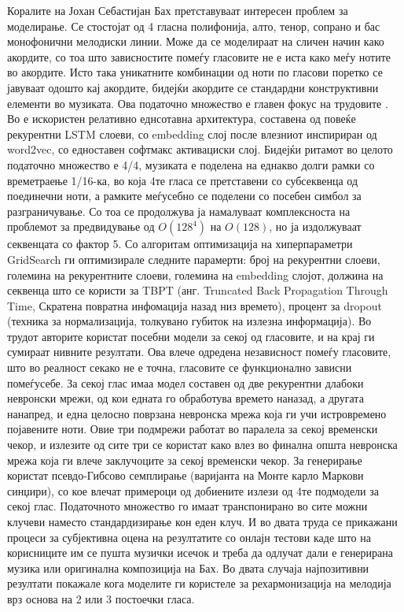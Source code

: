 Коралите на Јохан Себастијан Бах претставуваат интересен проблем за моделирање. Се стостојат од 4 гласна полифонија, алто, тенор, сопрано и бас монофонични мелодиски линии. Може да се моделираат на сличен начин како акордите, со тоа што зависностите помеѓу гласовите не е иста како меѓу нотите во акордите. Исто така уникатните комбинации од ноти по гласови поретко се јавуваат одошто кај акордите, бидејќи акордите се стандардни конструктивни елементи во музиката. Ова податочно множество е главен фокус на трудовите \cite{Liang2017, Hadjeres2016}. Во \cite{Liang2017} е искористен релативно еднсотавна архитектура, составена од повеќе рекурентни LSTM слоеви, со embedding слој после влезниот инспириран од word2vec\cite{Herremans2017}, со едноставен софтмакс активациски слој. Бидејќи ритамот во целото податочно множество е 4/4, музиката е поделена на еднакво долги рамки со времетраење 1/16-ка, во која 4те гласа се претставени со субсеквенца од поединечни ноти, а рамките меѓусебно се поделени со посебен симбол за разграничување. Со тоа се продолжува ја намалуваат комплексноста на проблемот за предвидување од $O(128^4)$ на $O(128)$, но ја издолжуваат секвенцата со фактор 5. Со алгоритам оптимизација на хиперпараметри GridSearch ги оптимизирале следните парамерти: број на рекурентни слоеви, големина на рекурентните слоеви, големина на embedding слојот, должина на секвенца што се користи за TBPT (анг. Truncated Back Propagation Through Time, Скратена повратна инфомација назад низ времето), процент за dropout (техника за нормализација, толкувано губиток на излезна информација). Во трудот \cite{Hadjeres2016} авторите користат посебни модели за секој од гласовите, и на крај ги сумираат нивните резултати. Ова влече одредена независност помеѓу гласовите, што во реалност секако не е точна, гласовите се функционално зависни помеѓусебе. За секој глас имаа модел составен од две рекурентни длабоки невронски мрежи, од кои едната го обработува времето наназад, а другата нанапред, и една целосно поврзана невронска мрежа која ги учи истровремено појавените ноти. Овие три подмрежи работат во паралела за секој временски чекор, и излезите од сите три се користат како влез во финална општа невронска мрежа која ги влече заклучоците за секој временски чекор. За генерирање користат псевдо-Гибсово семплирање (варијанта на Монте карло Маркови синџири), со кое влечат примероци од добиените излези од 4те подмодели за секој глас. Податочното множество го имаат транспонирано во сите можни клучеви наместо стандардизирање кон еден клуч. И во двата труда се прикажани процеси за субјективна оцена на резултатите со онлајн тестови каде што на корисниците им се пушта музички исечок и треба да одлучат дали е генерирана музика или оригинална композиција на Бах. Во двата случаја најпозитивни резултати покажале кога моделите ги користеле за рехармонизација на мелодија врз основа на 2 или 3 постоечки гласа.

